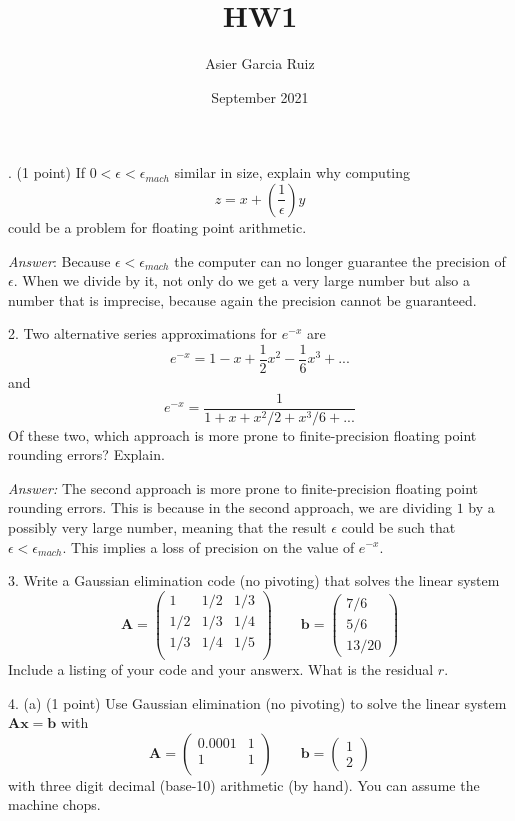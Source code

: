 \documentclass{article}
\title{HW1}
\author{Asier Garcia Ruiz }
\date{September 2021}
\begin{document}
    . (1 point) If $0 < \epsilon <\epsilon_{mach}$ similar in size, explain why computing 
    $$z = x + \left(\frac{1}{\epsilon}\right)y$$ could be a problem for floating point arithmetic.

    \textit{Answer}: Because $\epsilon < \epsilon_{mach}$ the computer can no longer guarantee
    the precision of $\epsilon$. When we divide by it, not only do we get a very large number
    but also a number that is imprecise, because again the precision cannot be guaranteed.

    \vspace{2mm}
    2. Two alternative series approximations for $e^{-x}$ are
    $$e^{-x} = 1 - x + \frac{1}{2}x^2 - \frac{1}{6}x^3 + ...$$ and 
    $$e^{-x} = \frac{1}{1 + x + x^2/2 + x^3/6 + ...}$$
    Of these two, which approach is more prone to finite-precision floating point rounding errors?
    Explain.
    
    \textit{Answer:} The second approach is more prone to finite-precision floating point rounding
    errors. This is because in the second approach, we are dividing $1$ by a possibly very large
    number, meaning that the result $\epsilon$ could be such that $\epsilon < \epsilon_{mach}$. This
    implies a loss of precision on the value of $e^{-x}$.

    \vspace{1cm}
    3. Write  a  Gaussian  elimination  code  (no  pivoting)  that  solves  the  linear  system
    $$\bm{A}=\begin{pmatrix}
        1 & 1/2 &  1/3 \\
        1/2 & 1/3 & 1/4 \\
        1/3 & 1/4 & 1/5 \\
    \end{pmatrix}
    \qquad \bm{b} = \begin{pmatrix}
        7/6 \\ 5/6\\ 13/20
    \end{pmatrix}$$
    Include a listing of your code and your answerx.  What is the residual $r$.

    \vspace{0.5cm}
    4. (a) (1 point) Use Gaussian elimination (no pivoting) to solve the linear system $\bm{A}\bm{x}=\bm{b}$
    with $$\bm{A}=\begin{pmatrix}
        0.0001 & 1 \\
        1 & 1 \\
    \end{pmatrix} \qquad \bm{b} = \begin{pmatrix}
        1 \\ 2
    \end{pmatrix}$$
    with three digit decimal (base-10) arithmetic (by hand).  You can assume the machine chops.
\end{document}
